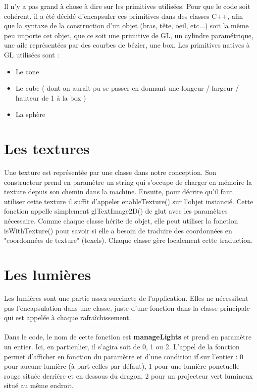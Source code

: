 \documentclass{article}
\begin{document}
Il n'y a pas grand à chose à dire sur les primitives utilisées. Pour que le code soit cohérent, il a été décidé d'encapsuler ces primitives dans des classes C++, afin que la syntaxe de la construction d'un objet (bras, tête, oeil, etc...) soit la même peu importe cet objet, que ce soit une primitive de GL, un cylindre paramétrique, une aile représentées par des courbes de bézier, une box.
\newline
\newline
Les primitives natives à GL utilisées sont : 
\begin{itemize}
	\item Le cone
	\item Le cube ( dont on aurait pu se passer en donnant une longeur / largeur / hauteur de 1 à la box )
	\item La sphère
\end{itemize}


\section{Les textures}

Une texture est représentée par une classe dans notre conception. Son constructeur prend en paramètre un string qui s'occupe de charger en mémoire la texture depuis son chemin dans la machine. Ensuite, pour décrire qu'il faut utiliser cette texture il suffit d'appeler enableTexture() sur l'objet instancié. Cette fonction appelle simplement glTextImage2D() de glut avec les paramètres nécessaire.  
\newline
\newline
Comme chaque classe hérite de objet, elle peut utiliser la fonction isWithTexture() pour savoir si elle a besoin de traduire des coordonnées en "coordonnées de texture" (texels). Chaque classe gère localement cette traduction.


\newpage
\section{Les lumières}

Les lumières sont une partie assez succincte de l'application. Elles ne nécessitent pas l'encapsulation dans une classe, juste d'une fonction dans la classe principale qui est appelée à chaque rafraîchissement. \\~\\
Dans le code, le nom de cette fonction est \textbf{manageLights} et prend en paramètre un entier. Ici, en particulier, il s'agira soit de 0, 1 ou 2. L'appel de la fonction permet d'afficher en fonction du paramètre et d'une condition if sur l'entier : 0 pour aucune lumière (à part celles par défaut), 1 pour une lumière ponctuelle rouge située derrière et en dessous du dragon, 2 pour un projecteur vert lumineux situé au même endroit.\\~\\
\end{document}
